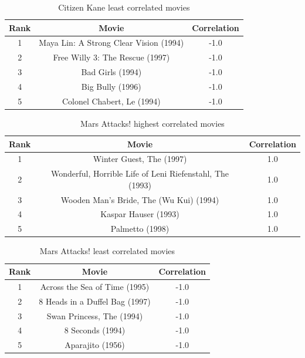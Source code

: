 \documentclass[letterpaper,11pt]{article}
\begin{document}
\begin{table}[htb]
\centering
\begin{tabular}{ | c | c | c |}
\hline
\textbf{Rank} & \textbf{Movie} & \textbf{Correlation} \\
\hline
1 & Maya Lin: A Strong Clear Vision (1994) & -1.0 \\
\hline
2 & Free Willy 3: The Rescue (1997) & -1.0 \\
\hline
3 & Bad Girls (1994) & -1.0 \\ 
\hline
4 & Big Bully (1996) & -1.0 \\
\hline
5 & Colonel Chabert, Le (1994) & -1.0 \\
\hline
\end{tabular}
\caption{Citizen Kane least correlated movies}
\label{table:q4least}
\end{table}


\begin{table}[htb]
\centering
\begin{tabular}{ | c | c | c |}
\hline
\textbf{Rank} & \textbf{Movie} & \textbf{Correlation} \\
\hline
1 & Winter Guest, The (1997) & 1.0 \\
\hline
2 & Wonderful, Horrible Life of Leni Riefenstahl, The (1993) & 1.0 \\
\hline
3 & Wooden Man's Bride, The (Wu Kui) (1994) & 1.0 \\ 
\hline
4 & Kaspar Hauser (1993) & 1.0 \\
\hline
5 & Palmetto (1998) & 1.0 \\
\hline
\end{tabular}
\caption{Mars Attacks! highest correlated movies}
\label{table:q4most2}
\end{table}

\begin{table}[htb]
\centering
\begin{tabular}{ | c | c | c |}
\hline
\textbf{Rank} & \textbf{Movie} & \textbf{Correlation} \\
\hline
1 & Across the Sea of Time (1995) & -1.0 \\
\hline
2 & 8 Heads in a Duffel Bag (1997) & -1.0 \\
\hline
3 & Swan Princess, The (1994) & -1.0 \\ 
\hline
4 & 8 Seconds (1994) & -1.0 \\
\hline
5 & Aparajito (1956) & -1.0 \\
\hline
\end{tabular}
\caption{Mars Attacks! least correlated movies}
\label{table:q4least2}
\end{table}
\end{document}
